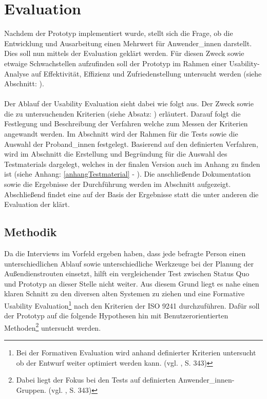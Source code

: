 \documentclass[Bachelorarbeit.tex]{subfiles}
\begin{document}
\chapter{Evaluation}
\label{chap:evalutation}

Nachdem der Prototyp implementiert wurde, stellt sich die Frage, ob die Entwicklung und Ausarbeitung einen Mehrwert für Anwender\_innen darstellt. 
Dies soll nun mittels der Evaluation geklärt werden.
Für diesen Zweck sowie etwaige Schwachstellen aufzufinden soll der Prototyp im Rahmen einer Usability-Analyse auf Effektivität, Effizienz und Zufriedenstellung \cite[vgl.][Abs.: 3]{Iso9241_11} untersucht werden (siehe Abschnitt: ).\\
\\
Der Ablauf der Usability Evaluation sieht dabei wie folgt aus.
Der Zweck sowie die zu untersuchenden Kriterien (siehe Absatz: ) erläutert.
Darauf folgt die Festlegung und Beschreibung der Verfahren welche zum Messen der Kriterien angewandt werden.
Im Abschnitt  wird der Rahmen für die Tests sowie die Auswahl der Proband\_innen festgelegt. 
Basierend auf den definierten Verfahren, wird im Abschnitt  die Erstellung und Begründung für die Auswahl des Testmaterials dargelegt, welches in der finalen Version auch im Anhang zu finden ist (siehe Anhang: \ref{anhangTestmaterial} - ).
Die anschließende Dokumentation sowie die Ergebnisse der Durchführung werden im Abschnitt  aufgezeigt.
Abschließend findet eine  auf der Basis der Ergebnisse statt die unter anderen die Evaluation der  klärt.

\section{Methodik}
\label{Methodik}

Da die Interviews im Vorfeld ergeben haben, dass jede befragte Person einen unterschiedlichen Ablauf sowie unterschiedliche Werkzeuge bei der Planung der Außendienstrouten einsetzt, hilft ein vergleichender Test zwischen Status Quo und Prototyp an dieser Stelle nicht weiter.
Aus diesem Grund liegt es nahe einen klaren Schnitt zu den diversen alten Systemen zu ziehen und eine Formative Usability Evaluation\footnote{Bei der Formativen Evaluation wird anhand definierter Kriterien untersucht ob der Entwurf weiter optimiert werden kann. (vgl. \cite{Burmester}, S. 343)} nach den Kriterien der ISO 9241 durchzuführen.
Dafür soll der Prototyp auf die folgende Hypothesen hin mit Benutzerorientierten Methoden\footnote{Dabei liegt der Fokus bei den Tests auf definierten Anwender\_innen-Gruppen. (vgl. \cite{Burmester}, S. 343)} untersucht werden.
\end{document}
